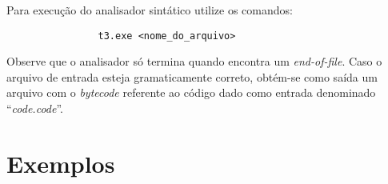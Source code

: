 \documentclass{article}
\begin{document}
	Para execução do analisador sintático utilize os comandos:

	\begin{center}
		\begin{minipage}[ht]{0.5\textwidth}
			\begin{verbatim}
				t3.exe <nome_do_arquivo>
			\end{verbatim}
		\end{minipage}
	\end{center}

	Observe que o analisador só termina quando encontra um \emph{end-of-file}. Caso o arquivo de entrada esteja gramaticamente correto, obtém-se como saída um arquivo com o \emph{bytecode} referente ao código dado como entrada denominado ``\emph{code.code}''.

\section{Exemplos} %
\label{sec:exemplos}

\end{document}

